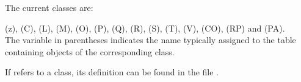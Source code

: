 The current classes are:

  (z),  (C),  (L),  (M),  (O),  (P),  (Q),  (R),  (S),  (T),  (V),  (CO),    (RP) and  (PA).\\

  The variable in parentheses indicates the name typically assigned to the table containing objects of the corresponding class.

If  refers to a class, its definition can be found in the file .
\endinput
